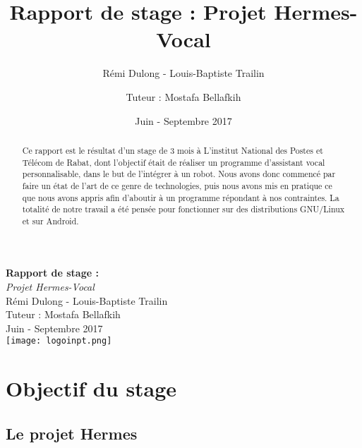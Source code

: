 \documentclass[a4paper,10pt]{report}
\title{Rapport de stage : Projet Hermes-Vocal}
\author{Rémi Dulong - Louis-Baptiste Trailin\and{Tuteur : Mostafa Bellafkih}}
\date{Juin - Septembre 2017}
\begin{document}

  \begin{titlepage}
    \centering
    \vfill
    {\bfseries \Huge
        Rapport de stage : \\
    }
    {\huge
        \textit{Projet Hermes-Vocal}\\
        Rémi Dulong - Louis-Baptiste Trailin\\
        Tuteur : Mostafa Bellafkih\\
        \vskip2cm
        Juin - Septembre 2017\\
    }
    \vfill
    \texttt{[image: logoinpt.png]} %
    \vfill
    \vfill
  \end{titlepage}

    \newpage

    \begin{abstract}
        {Ce rapport est le résultat d'un stage de 3 mois à L'institut National des Postes et Télécom de Rabat, dont l'objectif était de réaliser un programme d'assistant vocal personnalisable, dans le but de l'intégrer à un robot. Nous avons donc commencé par faire un état de l'art de ce genre de technologies, puis nous avons mis en pratique ce que nous avons appris afin d'aboutir à un programme répondant à nos contraintes. La totalité de notre travail a été pensée pour fonctionner sur des distributions GNU/Linux et sur Android.}
    \end{abstract}

    \tableofcontents
    \newpage

  \chapter{Objectif du stage}

    \section{Le projet Hermes}
\end{document}

